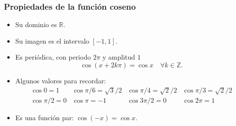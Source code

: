 	\begin{frame}
		\frametitle{Propiedades de la función coseno}
		\begin{itemize}
			\item Su dominio es $\mathbb{R}$.
			\item Su imagen es el intervalo $[-1,1]$.
			\item Es periódica, con periodo $2\pi$ y amplitud $1$
			      \[\cos (x+2k\pi)= \cos x\quad \forall k\in \mathbb{Z}.\]
			\item Algunos valores para recordar:
			      \[
			      	\begin{array}{llll}
			      		\cos 0=1      & \cos \pi/6= \sqrt{3}/2 & \cos \pi/4=\sqrt{2}/2 & \cos \pi/3= \sqrt{2}/2 \\
			      		\cos \pi/2 =0 & \cos \pi = -1          & \cos 3\pi/2=0         & \cos 2\pi=1            
			      	\end{array}
			      \]
			\item Es una función par: $\cos(-x)=\cos x$.
		\end{itemize}
	\end{frame} 
	
